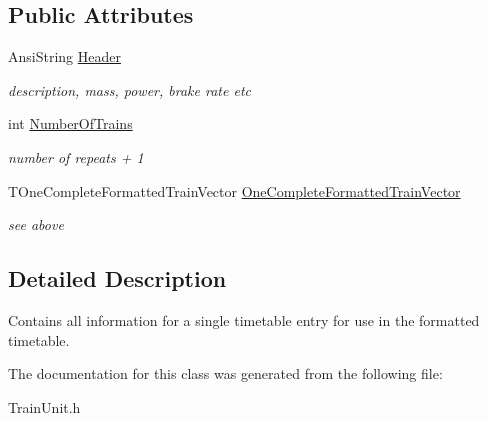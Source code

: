 \subsection*{Public Attributes}
\begin{DoxyCompactItemize}
\item 
\mbox{\label{class_t_train_formatted_information_a03b72f64d740876d99d1080b8d355441}} 
Ansi\+String \mbox{\hyperlink{class_t_train_formatted_information_a03b72f64d740876d99d1080b8d355441}{Header}}
\begin{DoxyCompactList}\small\item\em description, mass, power, brake rate etc \end{DoxyCompactList}\item 
\mbox{\label{class_t_train_formatted_information_a2f5bc8f1ff9b154a381660639c40dada}} 
int \mbox{\hyperlink{class_t_train_formatted_information_a2f5bc8f1ff9b154a381660639c40dada}{Number\+Of\+Trains}}
\begin{DoxyCompactList}\small\item\em number of repeats + 1 \end{DoxyCompactList}\item 
\mbox{\label{class_t_train_formatted_information_a7ed8168782c7afd5f7b42b41f5515c8f}} 
T\+One\+Complete\+Formatted\+Train\+Vector \mbox{\hyperlink{class_t_train_formatted_information_a7ed8168782c7afd5f7b42b41f5515c8f}{One\+Complete\+Formatted\+Train\+Vector}}
\begin{DoxyCompactList}\small\item\em see above \end{DoxyCompactList}\end{DoxyCompactItemize}


\subsection{Detailed Description}
Contains all information for a single timetable entry for use in the formatted timetable. 

The documentation for this class was generated from the following file\+:\begin{DoxyCompactItemize}
\item 
Train\+Unit.\+h\end{DoxyCompactItemize}
